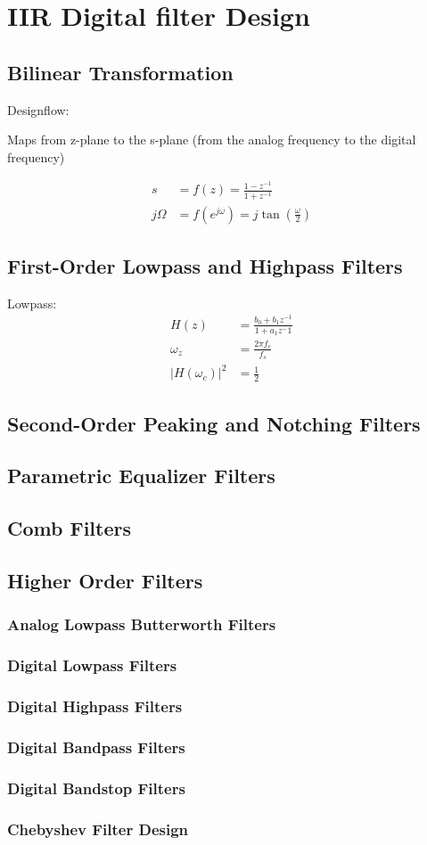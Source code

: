 \section{IIR Digital filter Design}
\subsection{Bilinear Transformation}
Designflow:
\begin{center}

\end{center}
Maps from z-plane to the s-plane (from the analog frequency to the digital
frequency)

\begin{align*}
s 		&= f(z) = \frac{1-z^{-1}}{1+z^{-1}}\\
j\Omega &= f(e^{j\omega}) = j \tan \left( \frac{\omega}{2} \right)
\end{align*}

\subsection{First-Order Lowpass and Highpass Filters}
Lowpass:
\begin{align}
	H(z) &= \frac{b_0 + b_1 z^{-1}}{1+a_1 z^-1}\\
	\omega_z &= \frac{2 \pi f_c}{f_s}\\
	|H(\omega_c)|^2 &= \frac{1}{2}
\end{align}
\subsection{Second-Order Peaking and Notching Filters}
\subsection{Parametric Equalizer Filters}
\subsection{Comb Filters}

\subsection{Higher Order Filters}
\subsubsection{Analog Lowpass Butterworth Filters}
\subsubsection{Digital Lowpass Filters}
\subsubsection{Digital Highpass Filters}
\subsubsection{Digital Bandpass Filters}
\subsubsection{Digital Bandstop Filters}
\subsubsection{Chebyshev Filter Design}

